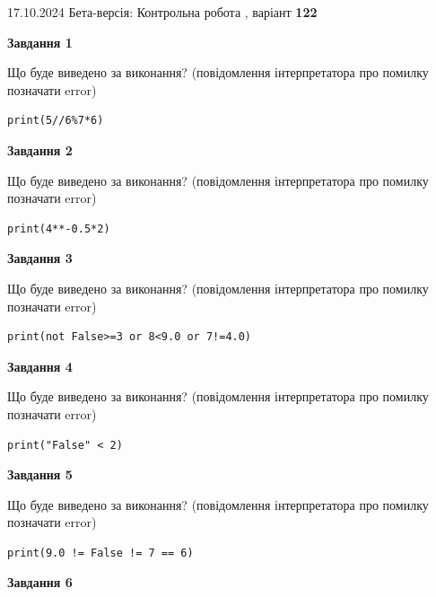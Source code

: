 \documentclass[12pt, ukrainian]{article}
\begin{document}
{\Large{17.10.2024 Бета-версія: Контрольна робота , варіант  \No \textbf { 122 }\par}}
{
\begin {large}
{\begin {center}\textbf{Завдання 1}\end {center}}

Що буде виведено за виконання? (повідомлення інтерпретатора про помилку позначати error)\par
\begin{verbatim}
print(5//6%7*6)
\end{verbatim}

{\begin {center}\textbf{Завдання 2}\end {center}}

Що буде виведено за виконання? (повідомлення інтерпретатора про помилку позначати error)\par
\begin{verbatim}
print(4**-0.5*2)
\end{verbatim}

{\begin {center}\textbf{Завдання 3}\end {center}}

Що буде виведено за виконання? (повідомлення інтерпретатора про помилку позначати error)\par
\begin{verbatim}
print(not False>=3 or 8<9.0 or 7!=4.0)
\end{verbatim}

{\begin {center}\textbf{Завдання 4}\end {center}}

Що буде виведено за виконання? (повідомлення інтерпретатора про помилку позначати error)\par
\begin{verbatim}
print("False" < 2)
\end{verbatim}

{\begin {center}\textbf{Завдання 5}\end {center}}

Що буде виведено за виконання? (повідомлення інтерпретатора про помилку позначати error)\par
\begin{verbatim}
print(9.0 != False != 7 == 6)
\end{verbatim}

{\begin {center}\textbf{Завдання 6}\end {center}}


\end{large}}
\end{document}
